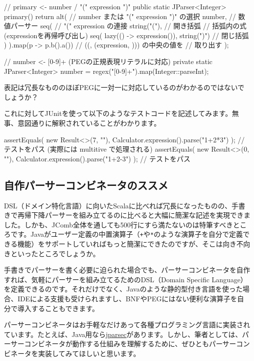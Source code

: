 \begin{codescreen}{}
{    // primary <- number / "(" expression ")"
    public static JParser<Integer> primary() {
        return alt( // number または "(" expression ")" の選択
            number, // 数値パーサー
            seq( // "(" expression の連接
                string("("), // 開き括弧
                // 括弧内の式 (expressionを再帰呼び出し)
                seq(
                    lazy(() -> expression()),
                    string(")") // 閉じ括弧
                )
            ).map(p -> p.b().a()) // ((, (expression, ))) の中央の値を
                                  // 取り出す
        );
    }
    
    // number <- [0-9]+ (PEGの正規表現リテラルに対応)
    private static JParser<Integer> number = 
        regex("[0-9]+").map(Integer::parseInt);
}
\end{codescreen}

表記は冗長なもののほぼPEGに一対一に対応しているのがわかるのではないでしょうか？

これに対してJUnitを使って以下のようなテストコードを記述してみます。無事、意図通りに解釈されていることがわかります。

\begin{codescreen}{}
assertEquals(
    new Result<>(7, ""), Calculator.expression().parse("1+2*3")
); // テストをパス (実際には multitive で処理される)
assertEquals(
    new Result<>(0, ""), Calculator.expression().parse("1+2-3")
); // テストをパス
\end{codescreen}

\subsection{自作パーサーコンビネータのススメ}

DSL（ドメイン特化言語）に向いたScalaに比べれば冗長になったものの、手書きで再帰下降パーサーを組み立てるのに比べると大幅に簡潔な記述を実現できました。しかも、JComb全体を通しても500行にすら満たないのは特筆すべきところです。Javaがユーザー定義の中置演算子（\texttt{+}や\texttt{*}のような演算子を自分で定義できる機能）をサポートしていればもっと簡潔にできたのですが、そこは向き不向きといったところでしょうか。

手書きでパーサーを書く必要に迫られた場合でも、パーサーコンビネータを自作すれば、気軽にパーサーを組み立てるためのDSL（Domain Specific Language）を定義できるのです。それだけでなく、Javaのような静的型付き言語を使った場合、IDEによる支援も受けられますし、BNFやPEGにはない便利な演算子を自分で導入することもできます。

パーサーコンビネータはお手軽なだけあって各種プログラミング言語に実装されています。たとえば、Java用なら\href{https://github.com/jparsec/jparsec}{jparsec}があります。しかし、筆者としては、パーサーコンビネータが動作する仕組みを理解するために、ぜひともパーサーコンビネータを実装してみてほしいと思います。

